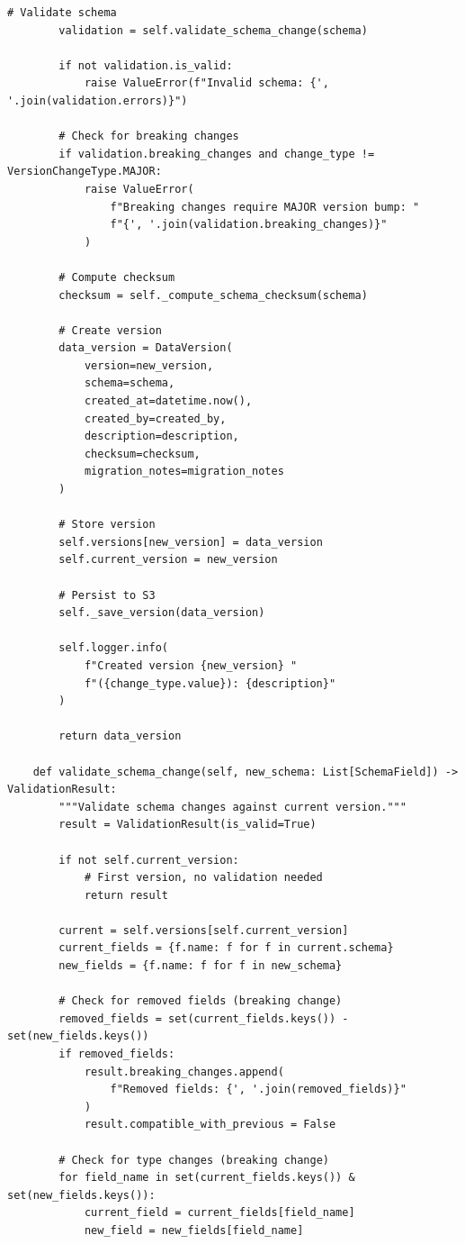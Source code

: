 \begin{lstlisting}[style=python, caption=DataVersionManager with Semantic Versioning]
        # Validate schema
        validation = self.validate_schema_change(schema)

        if not validation.is_valid:
            raise ValueError(f"Invalid schema: {', '.join(validation.errors)}")

        # Check for breaking changes
        if validation.breaking_changes and change_type != VersionChangeType.MAJOR:
            raise ValueError(
                f"Breaking changes require MAJOR version bump: "
                f"{', '.join(validation.breaking_changes)}"
            )

        # Compute checksum
        checksum = self._compute_schema_checksum(schema)

        # Create version
        data_version = DataVersion(
            version=new_version,
            schema=schema,
            created_at=datetime.now(),
            created_by=created_by,
            description=description,
            checksum=checksum,
            migration_notes=migration_notes
        )

        # Store version
        self.versions[new_version] = data_version
        self.current_version = new_version

        # Persist to S3
        self._save_version(data_version)

        self.logger.info(
            f"Created version {new_version} "
            f"({change_type.value}): {description}"
        )

        return data_version

    def validate_schema_change(self, new_schema: List[SchemaField]) -> ValidationResult:
        """Validate schema changes against current version."""
        result = ValidationResult(is_valid=True)

        if not self.current_version:
            # First version, no validation needed
            return result

        current = self.versions[self.current_version]
        current_fields = {f.name: f for f in current.schema}
        new_fields = {f.name: f for f in new_schema}

        # Check for removed fields (breaking change)
        removed_fields = set(current_fields.keys()) - set(new_fields.keys())
        if removed_fields:
            result.breaking_changes.append(
                f"Removed fields: {', '.join(removed_fields)}"
            )
            result.compatible_with_previous = False

        # Check for type changes (breaking change)
        for field_name in set(current_fields.keys()) & set(new_fields.keys()):
            current_field = current_fields[field_name]
            new_field = new_fields[field_name]


\end{lstlisting}
